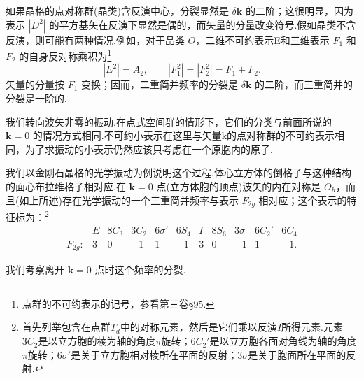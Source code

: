 如果晶格的点对称群(晶类)含反演中心，分裂显然是 $\delta\boldsymbol{k}$ 的二阶；这很明显，因为表示 $|D^2|$ 的平方基矢在反演下显然是偶的，而矢量的分量改变符号.假如晶类不含反演，则可能有两种情况.例如，对于晶类 $O$，二维不可约表示E和三维表示 $F_1$ 和 $F_2$ 的自身反对称乘积为\footnote{点群的不可约表示的记号，参看第三卷§95.}
\begin{equation*}
  |E^2|=A_2,\qquad |F_1^2|=|F_2^2|=F_1+F_2.
\end{equation*}
矢量的分量按 $F_1$ 变换；因而，二重简并频率的分裂是 $\delta\boldsymbol{k}$ 的二阶，而三重简并的分裂是一阶的.

我们转向波矢非零的振动.在点式空间群的情形下，它们的分类与前面所说的 $\boldsymbol{k}=0$ 的情况方式相同.不可约小表示在这里与矢量k的点对称群的不可约表示相同，为了求振动的小表示仍然应该只考虑在一个原胞内的原子.

我们以金刚石晶格的光学振动为例说明这个过程.体心立方体的倒格子与这种结构的面心布拉维格子相对应.在 $\boldsymbol{k}=0$ 点(立方体胞的顶点)波矢的内在对称是 $O_h$，而且(如上所述)存在光学振动的一个三重简并频率与表示 $F_{2g}$ 相对应；这个表示的特征标为：\footnote{首先列举包含在点群$T_d$中的对称元素，然后是它们乘以反演$I$所得元素.元素$3C_2$是以立方胞的棱为轴的角度$\pi$旋转；$6C_2'$是以立方胞各面对角线为轴的角度$\pi$旋转；$6\sigma'$是关于立方胞相对棱所在平面的反射；$3\sigma$是关于胞面所在平面的反射.}
\begin{equation*}
\begin{array}{lcccccccccc}
  & E & 8C_3 & 3C_2 & 6\sigma' & 6S_4 & I & 8S_6 & 3\sigma & 6C_2' & 6C_4 \\
  F_{2g}: & 3 & 0 & -1 & 1 & -1 & 3 & 0 & -1 & 1 & -1.
\end{array}
\end{equation*}

我们考察离开 $\boldsymbol{k}=0$ 点时这个频率的分裂.

